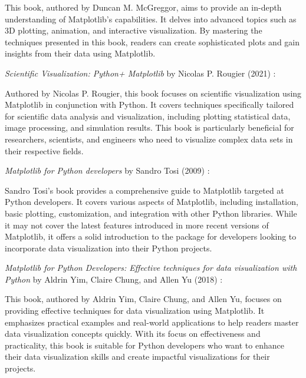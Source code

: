 This book, authored by Duncan M. McGreggor, aims to provide an in-depth understanding of Matplotlib's capabilities. It delves into advanced topics such as 3D plotting, animation, and interactive visualization. By mastering the techniques presented in this book, readers can create sophisticated plots and gain insights from their data using Matplotlib.

\textit{Scientific Visualization: Python+ Matplotlib} by Nicolas P. Rougier (2021) \cite{Rougier:2021}:

Authored by Nicolas P. Rougier, this book focuses on scientific visualization using Matplotlib in conjunction with Python. It covers techniques specifically tailored for scientific data analysis and visualization, including plotting statistical data, image processing, and simulation results. This book is particularly beneficial for researchers, scientists, and engineers who need to visualize complex data sets in their respective fields.

\textit{Matplotlib for Python developers} by Sandro Tosi (2009) \cite{Tosi:2009}:

Sandro Tosi's book provides a comprehensive guide to Matplotlib targeted at Python developers. It covers various aspects of Matplotlib, including installation, basic plotting, customization, and integration with other Python libraries. While it may not cover the latest features introduced in more recent versions of Matplotlib, it offers a solid introduction to the package for developers looking to incorporate data visualization into their Python projects.

\textit{Matplotlib for Python Developers: Effective techniques for data visualization with Python} by Aldrin Yim, Claire Chung, and Allen Yu (2018) \cite{Yim:2018}:

This book, authored by Aldrin Yim, Claire Chung, and Allen Yu, focuses on providing effective techniques for data visualization using Matplotlib. It emphasizes practical examples and real-world applications to help readers master data visualization concepts quickly. With its focus on effectiveness and practicality, this book is suitable for Python developers who want to enhance their data visualization skills and create impactful visualizations for their projects.












